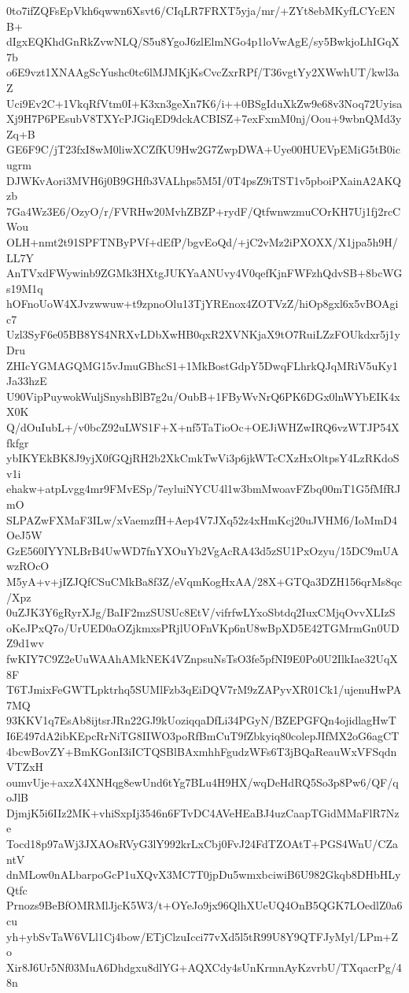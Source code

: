 0to7ifZQFsEpVkh6qwwn6Xsvt6/CIqLR7FRXT5yja/mr/+ZYt8ebMKyfLCYcENB+
dIgxEQKhdGnRkZvwNLQ/S5u8YgoJ6zlElmNGo4p1loVwAgE/sy5BwkjoLhIGqX7b
o6E9vzt1XNAAgScYushc0tc6lMJMKjKsCvcZxrRPf/T36vgtYy2XWwhUT/kwl3aZ
Uci9Ev2C+1VkqRfVtm0I+K3xn3geXn7K6/i++0BSgIduXkZw9e68v3Noq72Uyisa
Xj9H7P6PEsubV8TXYcPJGiqED9dckACBISZ+7exFxmM0nj/Oou+9wbnQMd3yZq+B
GE6F9C/jT23fxI8wM0liwXCZfKU9Hw2G7ZwpDWA+Uye00HUEVpEMiG5tB0icugrm
DJWKvAori3MVH6j0B9GHfb3VALhps5M5I/0T4psZ9iTST1v5pboiPXainA2AKQzb
7Ga4Wz3E6/OzyO/r/FVRHw20MvhZBZP+rydF/QtfwnwzmuCOrKH7Uj1fj2rcCWou
OLH+nmt2t91SPFTNByPVf+dEfP/bgvEoQd/+jC2vMz2iPXOXX/X1jpa5h9H/LL7Y
AnTVxdFWywinb9ZGMk3HXtgJUKYaANUvy4V0qefKjnFWFzhQdvSB+8bcWGs19M1q
hOFnoUoW4XJvzwwuw+t9zpnoOlu13TjYREnox4ZOTVzZ/hiOp8gxl6x5vBOAgic7
Uzl3SyF6e05BB8YS4NRXvLDbXwHB0qxR2XVNKjaX9tO7RuiLZzFOUkdxr5j1yDru
ZHIcYGMAGQMG15vJmuGBhcS1+1MkBostGdpY5DwqFLhrkQJqMRiV5uKy1Ja33hzE
U90VipPuywokWuljSnyshBlB7g2u/OubB+1FByWvNrQ6PK6DGx0lnWYbEIK4xX0K
Q/dOuIubL+/v0bcZ92uLWS1F+X+nf5TaTioOc+OEJiWHZwIRQ6vzWTJP54Xfkfgr
ybIKYEkBK8J9yjX0fGQjRH2b2XkCmkTwVi3p6jkWTcCXzHxOltpsY4LzRKdoSv1i
ehakw+atpLvgg4mr9FMvESp/7eyluiNYCU4l1w3bmMwoavFZbq00mT1G5fMfRJmO
SLPAZwFXMaF3ILw/xVaemzfH+Aep4V7JXq52z4xHmKcj20uJVHM6/IoMmD4OeJ5W
GzE560IYYNLBrB4UwWD7fnYXOuYb2VgAcRA43d5zSU1PxOzyu/15DC9mUAwzROcO
M5yA+v+jIZJQfCSuCMkBa8f3Z/eVqmKogHxAA/28X+GTQa3DZH156qrMs8qc/Xpz
0uZJK3Y6gRyrXJg/BaIF2mzSUSUc8EtV/vifrfwLYxoSbtdq2IuxCMjqOvvXLIzS
oKeJPxQ7o/UrUED0aOZjkmxsPRjlUOFnVKp6nU8wBpXD5E42TGMrmGn0UDZ9d1wv
fwKIY7C9Z2eUuWAAhAMkNEK4VZnpsuNsTsO3fe5pfNI9E0Po0U2IlkIae32UqX8F
T6TJmixFeGWTLpktrhq5SUMlFzb3qEiDQV7rM9zZAPyvXR01Ck1/ujenuHwPA7MQ
93KKV1q7EsAb8ijtsrJRn22GJ9kUoziqqaDfLi34PGyN/BZEPGFQn4ojidlagHwT
I6E497dA2ibKEpcRrNiTG8IIWO3poRfBmCuT9fZbkyiq80colepJIfMX2oG6agCT
4bcwBovZY+BmKGonI3iICTQSBlBAxmhhFgudzWFs6T3jBQaReauWxVFSqdnVTZxH
oumvUje+axzX4XNHqg8ewUnd6tYg7BLu4H9HX/wqDeHdRQ5So3p8Pw6/QF/qoJlB
DjmjK5i6IIz2MK+vhiSxpIj3546n6FTvDC4AVeHEaBJ4uzCaapTGidMMaFlR7Nze
Tocd18p97aWj3JXAOsRVyG3lY992krLxCbj0FvJ24FdTZOAtT+PGS4WnU/CZantV
dnMLow0nALbarpoGcP1uXQvX3MC7T0jpDu5wmxbciwiB6U982Gkqb8DHbHLyQtfc
Prnozs9BeBfOMRMlJjcK5W3/t+OYeJo9jx96QlhXUeUQ4OnB5QGK7LOedlZ0a6cu
yh+ybSvTaW6VLl1Cj4bow/ETjClzuIcci77vXd5l5tR99U8Y9QTFJyMyl/LPm+Zo
Xir8J6Ur5Nf03MuA6Dhdgxu8dlYG+AQXCdy4sUnKrmnAyKzvrbU/TXqacrPg/48n
